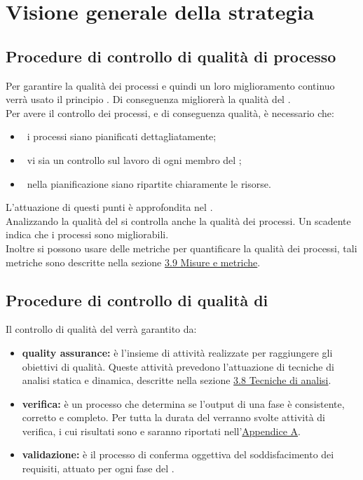 
\section{Visione generale della strategia}
	\subsection{Procedure di controllo di qualità di processo}
		Per garantire la qualità dei processi e quindi un loro miglioramento continuo verrà usato il principio . Di conseguenza migliorerà la qualità del . \\
		Per avere il controllo dei processi, e di conseguenza qualità, è necessario che:
		\begin{itemize}
			\item\ i processi siano pianificati dettagliatamente;
			\item\ vi sia un controllo sul lavoro di ogni membro del ;
			\item\ nella pianificazione siano ripartite chiaramente le risorse.
		\end{itemize}
		L'attuazione di questi punti è approfondita nel \PPdoc. \\
		Analizzando la qualità del  si controlla anche la qualità dei processi. Un  scadente indica che i processi sono migliorabili. \\
		Inoltre si possono usare delle metriche per quantificare la qualità dei processi, tali metriche sono descritte nella sezione \hyperref[sec:3.9]{3.9 Misure e metriche}.
	\subsection{Procedure di controllo di qualità di }
		Il controllo di qualità del  verrà garantito da:
		\begin{itemize}
			\item \textbf{quality assurance:} è l'insieme di attività realizzate per raggiungere gli obiettivi di qualità. Queste attività prevedono l'attuazione di tecniche di analisi statica e dinamica, descritte nella sezione \hyperref[sec:3.8]{3.8 Tecniche di analisi}.
			\item \textbf{verifica:} è un processo che determina se l'output di una fase è consistente, corretto e completo. Per tutta la durata del  verranno svolte attività di verifica, i cui risultati sono e saranno riportati nell'\hyperref[sec:A]{Appendice A}.
			\item \textbf{validazione:} è il processo di conferma oggettiva del soddisfacimento dei requisiti, attuato per ogni fase del .
		\end{itemize}
